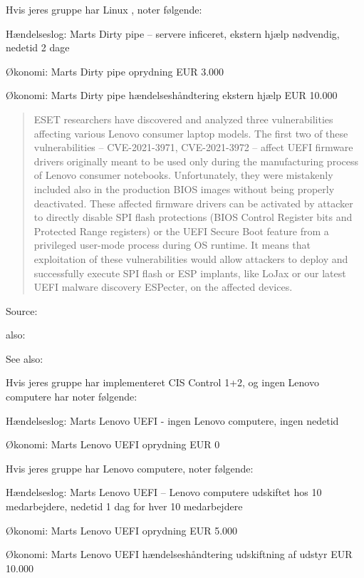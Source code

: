 \documentclass[Screen16to9,17pt]{foils}
\begin{document}
Hvis jeres gruppe har Linux , noter følgende:
\begin{list2}
\item Hændelseslog: Marts Dirty pipe -- servere inficeret, ekstern hjælp nødvendig, nedetid 2 dage
\item Økonomi: Marts Dirty pipe oprydning EUR 3.000
\item Økonomi: Marts Dirty pipe hændelseshåndtering ekstern hjælp EUR 10.000
\end{list2}




\begin{quote}
ESET researchers have discovered and analyzed three vulnerabilities affecting various Lenovo consumer laptop models. The first two of these vulnerabilities – CVE-2021-3971, CVE-2021-3972 – affect UEFI firmware drivers originally meant to be used only during the manufacturing process of Lenovo consumer notebooks. Unfortunately, they were mistakenly included also in the production BIOS images without being properly deactivated. These affected firmware drivers can be activated by attacker to directly disable SPI flash protections (BIOS Control Register bits and Protected Range registers) or the UEFI Secure Boot feature from a privileged user-mode process during OS runtime. It means that exploitation of these vulnerabilities would allow attackers to deploy and successfully execute SPI flash or ESP implants, like LoJax or our latest UEFI malware discovery ESPecter, on the affected devices.
\end{quote}

Source:

also:

See also:



Hvis jeres gruppe har implementeret CIS Control 1+2, og ingen Lenovo computere har noter følgende:
\begin{list2}
\item Hændelseslog: Marts Lenovo UEFI - ingen Lenovo computere, ingen nedetid
\item Økonomi: Marts Lenovo UEFI oprydning EUR 0
\end{list2}


Hvis jeres gruppe har Lenovo computere, noter følgende:
\begin{list2}
\item Hændelseslog: Marts Lenovo UEFI -- Lenovo computere udskiftet hos 10 medarbejdere, nedetid 1 dag for hver 10 medarbejdere
\item Økonomi: Marts Lenovo UEFI oprydning EUR 5.000
\item Økonomi: Marts Lenovo UEFI hændelseshåndtering udskiftning af udstyr EUR 10.000
\end{list2}
\end{document}
